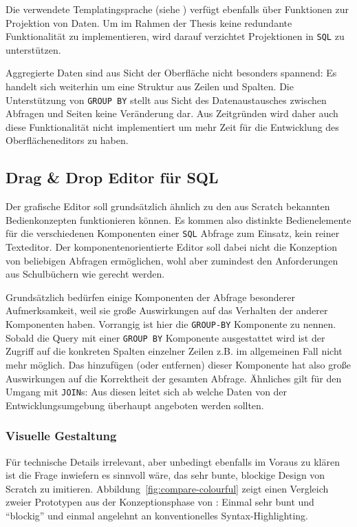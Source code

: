 Die verwendete Templatingsprache (siehe ) verfügt ebenfalls über Funktionen zur Projektion von Daten. Um im Rahmen der Thesis keine redundante Funktionalität zu implementieren, wird darauf verzichtet Projektionen in \texttt{SQL} zu unterstützen.

Aggregierte Daten sind aus Sicht der Oberfläche nicht besonders spannend: Es handelt sich weiterhin um eine Struktur aus Zeilen und Spalten. Die Unterstützung von \texttt{GROUP BY} stellt aus Sicht des Datenaustausches zwischen Abfragen und Seiten keine Veränderung dar. Aus Zeitgründen wird daher auch diese Funktionalität nicht implementiert um mehr Zeit für die Entwicklung des Oberflächeneditors zu haben.

\subsection{Drag \& Drop Editor für SQL}
\label{sec:design-sql-editor}

Der grafische Editor soll grundsätzlich ähnlich zu den aus Scratch bekannten Bedienkonzepten funktionieren können. Es kommen also distinkte Bedienelemente für die verschiedenen Komponenten einer \texttt{SQL} Abfrage zum Einsatz, kein reiner Texteditor. Der komponentenorientierte Editor soll dabei nicht die Konzeption von beliebigen Abfragen ermöglichen, wohl aber zumindest den Anforderungen aus Schulbüchern wie \cite{grimm_informatik_2015, hubwieser_inf_2} gerecht werden.

Grundsätzlich bedürfen einige Komponenten der Abfrage besonderer Aufmerksamkeit, weil sie große Auswirkungen auf das Verhalten der anderer Komponenten haben. Vorrangig ist hier die \texttt{GROUP-BY} Komponente zu nennen. Sobald die Query mit einer \texttt{GROUP BY} Komponente ausgestattet wird ist der Zugriff auf die konkreten Spalten einzelner Zeilen z.B. im allgemeinen Fall nicht mehr möglich. Das hinzufügen (oder entfernen) dieser Komponente hat also große Auswirkungen auf die Korrektheit der gesamten Abfrage. Ähnliches gilt für den Umgang mit \texttt{JOIN}s: Aus diesen leitet sich ab welche Daten von der Entwicklungsumgebung überhaupt angeboten werden sollten.

\subsubsection{Visuelle Gestaltung}

Für technische Details irrelevant, aber unbedingt ebenfalls im Voraus zu klären ist die Frage inwiefern es sinnvoll wäre, das sehr bunte, blockige Design von Scratch zu imitieren. Abbildung~\ref{fig:compare-colourful} zeigt einen Vergleich zweier Prototypen aus der Konzeptionsphase von \idename{}: Einmal sehr bunt und ``blockig'' und einmal angelehnt an konventionelles Syntax-Highlighting.


